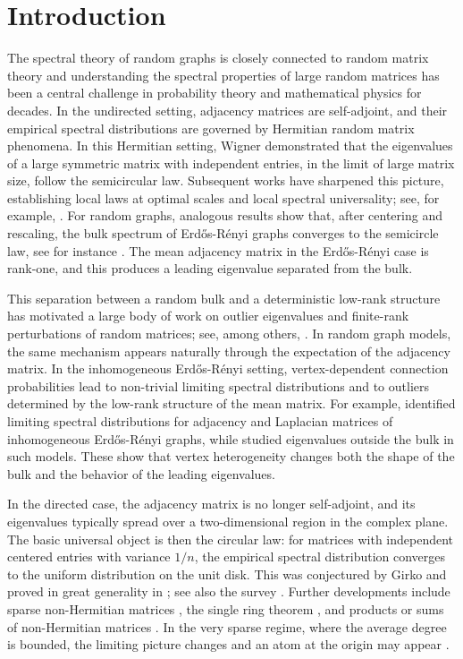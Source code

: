 \documentclass[11pt,oneside]{amsart}
\theoremstyle{plain}
\numberwithin{equation}{section}
\begin{document}


\section{Introduction}

The spectral theory of random graphs is closely connected to random matrix theory and understanding the spectral properties of large random matrices has been a central challenge in probability theory and mathematical physics for decades. In the undirected setting, adjacency matrices are self-adjoint, and their empirical spectral distributions are governed by Hermitian random matrix phenomena. In this Hermitian setting, Wigner demonstrated that the eigenvalues of a large symmetric matrix with independent entries, in the limit of large matrix size, follow the semicircular law. Subsequent works have sharpened this picture,
establishing local laws at optimal scales and local spectral universality;
see, for example, \cite{erdos2017dynamical}. For random graphs, analogous results show that, after centering and rescaling, the bulk spectrum of Erd\H{o}s-R\'enyi graphs converges to the semicircle law, see for instance \cite{EKetal, EKetalII}. The mean adjacency matrix in the Erd\H{o}s-R\'enyi case is rank-one, and this produces a leading eigenvalue separated from the bulk.

This separation between a random bulk and a deterministic low-rank structure has motivated a large body of work on outlier eigenvalues and finite-rank perturbations of random matrices; see, among others, \cite{BN, CDF, PRS}. In random graph models, the same mechanism appears naturally through the expectation of the adjacency matrix. In the inhomogeneous Erd\H{o}s-R\'enyi setting, vertex-dependent connection probabilities lead to non-trivial limiting spectral distributions and to outliers determined by the low-rank structure of the mean matrix. For example, \cite{CHHS, zhu2020graphon} identified limiting spectral distributions for adjacency and Laplacian matrices of inhomogeneous Erd\H{o}s-R\'enyi graphs, while \cite{CCH} studied eigenvalues outside the bulk in such models. These show that vertex heterogeneity changes both the shape of the bulk and the behavior of the leading eigenvalues. 

In the directed case, the adjacency matrix is no longer self-adjoint, and its eigenvalues typically spread over a two-dimensional region in the complex plane. The basic universal object is then the circular law: for matrices with independent centered entries with variance $1/n$, the empirical spectral distribution converges to the uniform distribution on the unit disk. This was conjectured by Girko and proved in great generality in \cite{TV, TVK, GT10}; see also the survey \cite{BC}. Further developments include sparse non-Hermitian matrices \cite{BasakRudelson19, RudelsonTikhomirov19, Revisited}, the single ring theorem \cite{GKZ}, and products or sums of non-Hermitian matrices \cite{GKT, KT}. In the very sparse regime, where the average degree is bounded, the limiting picture changes and an atom at the origin may appear \cite{SahSahasrabudheSawhney25}.
\end{document}
